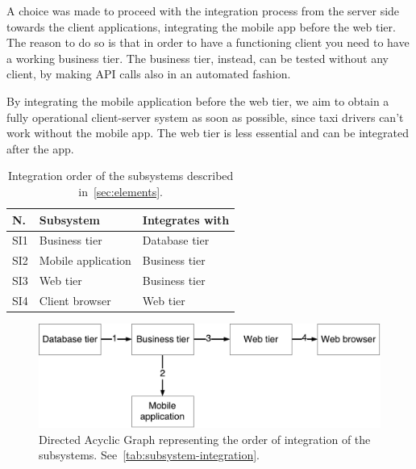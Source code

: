 A choice was made to proceed with the integration process from the server side towards the client applications, integrating the mobile app before the web tier.
The reason to do so is that in order to have a functioning client you need to have a working business tier.
The business tier, instead, can be tested without any client, by making API calls also in an automated fashion.

By integrating the mobile application before the web tier, we aim to obtain a fully operational client-server system as soon as possible, since taxi drivers can't work without the mobile app.
The web tier is less essential and can be integrated after the app.

\begin{table}
    \centering
    \begin{tabular}{| l | l | l |}
        \hline
        \textbf{N.} & \textbf{Subsystem} & \textbf{Integrates with} \\
        \hline
        SI1 & Business tier & Database tier\\
        SI2 & Mobile application & Business tier\\
        SI3 & Web tier & Business tier\\
        SI4 & Client browser & Web tier\\
        \hline
    \end{tabular}
    \caption{Integration order of the subsystems described in~\autoref{sec:elements}.}
    \label{tab:subsystem-integration}
\end{table}

\begin{figure}
    \centering
    \includegraphics[width=\textwidth]{figures/subsystems_integration_dag.pdf}
    \caption{Directed Acyclic Graph representing the order of integration of the subsystems. See~\autoref{tab:subsystem-integration}.}
    \label{fig:subsystem-integration}
\end{figure}
